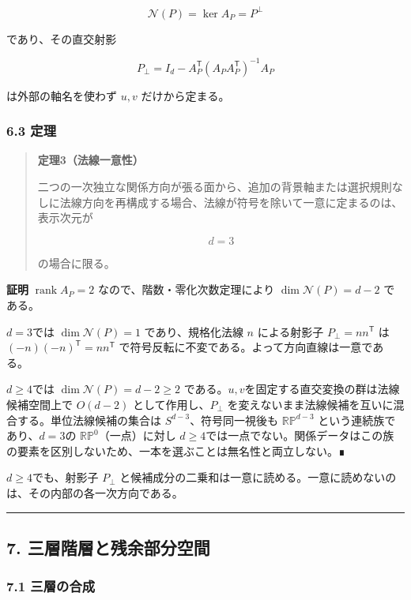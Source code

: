 \documentclass[
  a4paper,
]{ltjsarticle}
\begin{document}
\[
\mathcal N(P)=\ker A_P=P^\perp
\]

であり、その直交射影

\[
P_\perp=I_d-A_P^{\mathsf T}\left(A_PA_P^{\mathsf T}\right)^{-1}A_P
\]

は外部の軸名を使わず \(u,v\) だけから定まる。

\subsubsection{6.3 定理}\label{ux5b9aux7406-2}

\begin{quote}
\textbf{定理3（法線一意性）}

二つの一次独立な関係方向が張る面から、追加の背景軸または選択規則なしに法線方向を再構成する場合、法線が符号を除いて一意に定まるのは、表示次元が

\[
d=3
\]

の場合に限る。
\end{quote}

\textbf{証明} \(\operatorname{rank}A_P=2\)
なので、階数・零化次数定理により \(\dim\mathcal N(P)=d-2\) である。

\(d=3\)では \(\dim\mathcal N(P)=1\) であり、規格化法線 \(n\)
による射影子 \(P_\perp=nn^{\mathsf T}\) は
\((-n)(-n)^{\mathsf T}=nn^{\mathsf T}\)
で符号反転に不変である。よって方向直線は一意である。

\(d\ge4\)では \(\dim\mathcal N(P)=d-2\ge2\)
である。\(u,v\)を固定する直交変換の群は法線候補空間上で \(O(d-2)\)
として作用し、\(P_\perp\)
を変えないまま法線候補を互いに混合する。単位法線候補の集合は
\(S^{d-3}\)、符号同一視後も \(\mathbb{RP}^{d-3}\)
という連続族であり、\(d=3\)の \(\mathbb{RP}^0\)（一点）に対し
\(d\ge4\)では一点でない。関係データはこの族の要素を区別しないため、一本を選ぶことは無名性と両立しない。∎

\(d\ge4\)でも、射影子 \(P_\perp\)
と候補成分の二乗和は一意に読める。一意に読めないのは、その内部の各一次方向である。

\begin{center}\rule{0.5\linewidth}{0.5pt}\end{center}

\subsection{7.
三層階層と残余部分空間}\label{ux4e09ux5c64ux968eux5c64ux3068ux6b8bux4f59ux90e8ux5206ux7a7aux9593}

\subsubsection{7.1 三層の合成}\label{ux4e09ux5c64ux306eux5408ux6210}
\end{document}

